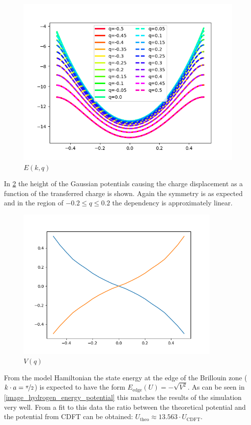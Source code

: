 \begin{figure}
	\centering
	\includegraphics[width = 12cm]{Images/Hydrogen/hydrogen_charged_bands}
	\caption{$E(k, q)$}
	\label{image_hydrogen_charged_bands}
\end{figure}




In \cref{image_hydrogen_charge_potential} the height of the Gaussian potentials causing the charge displacement as a function of the transferred charge is shown. Again the symmetry is as expected and in the region of $-0.2 \le q \le 0.2$ the dependency is approximately linear.

\begin{figure}
	\centering
	\includegraphics[width = 10cm]{Images/Hydrogen/hydrogen_charge_potential}
	\caption{$V(q)$}
	\label{image_hydrogen_charge_potential}
\end{figure}

From the model Hamiltonian the state energy at the edge of the Brillouin zone ($k\cdot a = \nicefrac{\pi}{2}$) is expected to have the form $E_\text{edge}(U) = -\sqrt{V^2}$. As can be seen in \cref{image_hydrogen_energy_potential} this matches the results of the simulation very well. From a fit to this data the ratio between the theoretical potential and the potential from CDFT can be obtained: $U_\text{theo} \approx 13.563 \cdot U_\text{CDFT}$.

